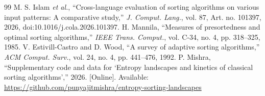 \documentclass[10pt,journal]{IEEEtran}
\begin{document}
\begin{thebibliography}{99}
 M. S. Islam \emph{et al.}, ``Cross-language evaluation of sorting algorithms on various input patterns: A comparative study,'' \emph{J. Comput. Lang.}, vol. 87, Art. no. 101397, 2026, doi:10.1016/j.cola.2026.101397.
 H. Mannila, ``Measures of presortedness and optimal sorting algorithms,'' \emph{IEEE Trans. Comput.}, vol. C-34, no. 4, pp. 318--325, 1985.
 V. Estivill-Castro and D. Wood, ``A survey of adaptive sorting algorithms,'' \emph{ACM Comput. Surv.}, vol. 24, no. 4, pp. 441--476, 1992.
 P. Mishra, ``Supplementary code and data for `Entropy landscapes and kinetics of classical sorting algorithms','' 2026. [Online]. Available: \url{https://github.com/punyajitmishra/entropy-sorting-landscapes}
\end{thebibliography}
\end{document}
